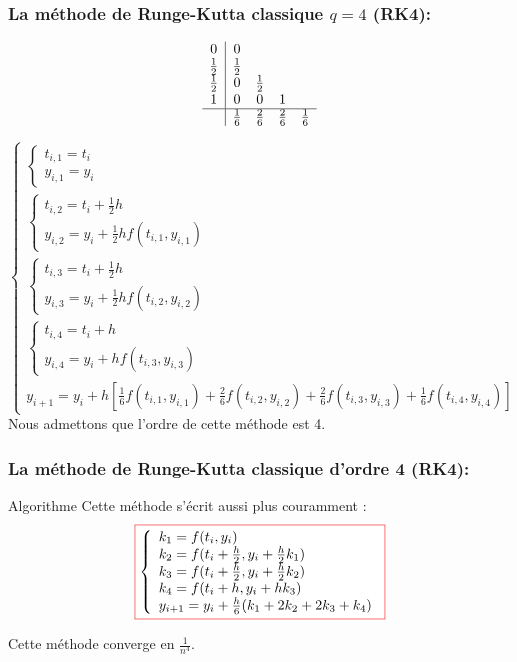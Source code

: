 \documentclass{beamer}
\newcommand{\myredbox}[1]{\fcolorbox{red}{white}{$\displaystyle#1$}}
\begin{document}
\begin{frame}
 \frametitle{La méthode de Runge-Kutta classique  $q=4$ (RK4):}

\[\begin{array}{c|ccccc}
0&0&&&\\
\frac 12&\frac 12 &&&\\
\frac 12&0&\frac 12&&\\
1&0&0&1&\\ \hline
&\frac 16&\frac 26&\frac 26&\frac 16
\end{array}\]

\[\left\{\begin{array}{l}
 \left\{\begin{array}{l}
 t_{i,1}=t_{i}\\
 y_{i,1}=y_{i}
\end{array}\right.\\
\left\{\begin{array}{l}
 t_{i,2}=t_{i}+\frac 12 h\\
 y_{i,2}=y_{i}+\frac 12 hf(t_{i,1},y_{i,1})
\end{array}\right.\\
\left\{\begin{array}{l}
 t_{i,3}=t_{i}+\frac 12 h\\
 y_{i,3}=y_{i}+\frac 12 hf(t_{i,2},y_{i,2})
\end{array}\right.\\   
\left\{\begin{array}{l}
 t_{i,4}=t_{i}+ h\\
 y_{i,4}=y_{i}+ hf(t_{i,3},y_{i,3})
\end{array}\right.\\
 y_{i+1}=y_{i}+h\left[\frac 16 f(t_{i,1},y_{i,1})+\frac 26 f(t_{i,2},y_{i,2})+\frac 26 f(t_{i,3},y_{i,3})+\frac 16 f(t_{i,4},y_{i,4})\right]
\end{array}\right.\]
Nous admettons que l'ordre de cette méthode est 4.
\end{frame}      
      
\begin{frame}     
\frametitle{La méthode de Runge-Kutta classique  d'ordre 4 (RK4):}
\begin{block}{Algorithme}
Cette méthode s'écrit aussi plus couramment :
   \[\myredbox{\left\{\begin{array}{l}   
k_1 = f (t_i , y_i )\\
k_2 = f (t_i + \frac h2 , y_i +  \frac h2 k_1)\\
k_3 = f (t_i +  \frac h2 , y_i +  \frac h2 k_2)\\
k_4 = f (t_i + h, y_i + hk_3)\\
y_{i+1} = y_i + \frac h6(k_1 + 2k_2 + 2k_3 +k_4)
  \end{array}\right.}\]  
  
  Cette méthode converge en $\displaystyle \frac 1{n^4}$.  
\end{block}
\end{frame}   
\end{document}
